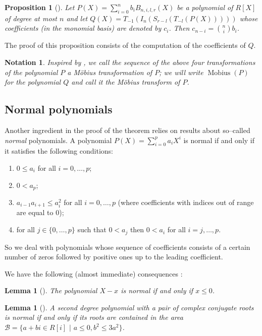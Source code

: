\documentclass[11pt, a4paper]{article}
\newtheorem{lemma}[mtheorem]{Lemma}
\newtheorem{proposition}[mtheorem]{Proposition}
\newtheorem{notation}[mtheorem]{Notation}
\DeclareMathOperator{\Mob}{M{o}bius}
\newcommand{\ssb}{{\mathcal B}}
\begin{document}
\begin{proposition}[\cite{bpr}]
Let $P(X) = \sum_{i=0}^n b_i B_{n,i,l,r} (X)$ be a polynomial of $R[X]$ of degree at most $n$ and let $Q(X) = T_{-1} (I_n (S_{r-l} (T_{-l}(P(X)))))$ whose coefficients (in the monomial basis) are denoted by $c_i$.
Then $c_{n-i} = {n \choose i} b_i$.
\label{bernQ}
\end{proposition}

The proof of this proposition consists of the computation of the coefficients of $Q$.

\begin{notation}
Inspired by \cite{eigenwillig_phd}, we call the sequence of the above four transformations of the polynomial $P$ a {\em M\"obius transformation} of $P$; we will write $\Mob(P)$ for the polynomial $Q$ and call it the {\em M\"obius transform} of $P$.
\end{notation}

\subsection{Normal polynomials}
\label{normal_math}

Another ingredient in the proof of the theorem relies on results about so--called {\em normal} polynomials. A polynomial $P (X) =\sum_{i=0}^p a_i X^i$ is normal if and only if it satisfies the following conditions:
\begin{enumerate}
 \item $0 \leq a_i$ for all $i=0,\ldots,p$;
 \item $0 < a_p$;
 \item $a_{i-1} a_{i+1} \leq a_i^2$ for all $i=0,\ldots,p$ (where coefficients with indices out of range are equal to 0);
 \item for all $j \in \{0,\ldots,p\}$ such that $0 < a_j$ then $0< a_i$ for all $i=j,\ldots,p$.
\end{enumerate}
So we deal with polynomials whose sequence of coefficients consists of a certain number of zeros followed by positive ones up to the leading coefficient.

We have the following (almost immediate) consequences :

\begin{lemma}[\cite{bpr}]
The polynomial $X-x$ is normal if and only if $x \leq 0$.
\label{lemma241}
\end{lemma}

\begin{lemma}[\cite{bpr}]
A second degree polynomial with a pair of complex conjugate roots is normal if and only if its roots are contained in the area $\ssb = \{a +bi \in R[i] \phantom{i} | \phantom{i} a \leq 0, b^2 \leq 3a^2 \}$.
\label{lemma242}
\end{lemma}
\end{document}
